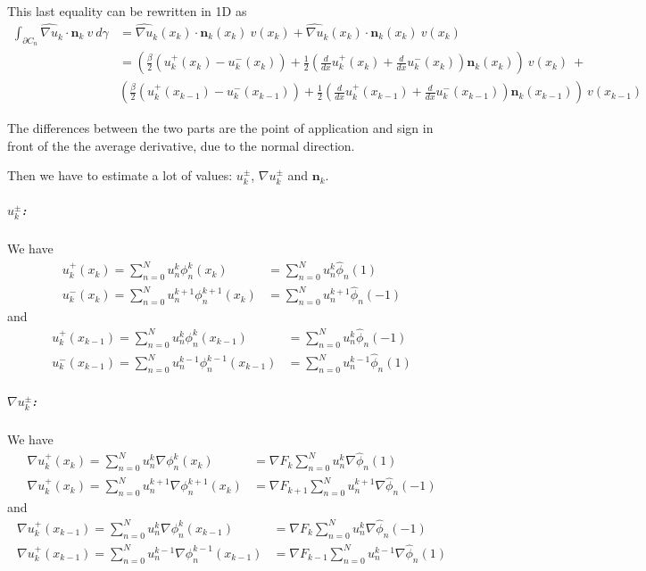 \documentclass[a4paper,10pt,draft]{article}
\begin{document}
This last equality can be rewritten in 1D as
\begin{align*}
 \int_{\partial C_n} \widehat{\nabla u}_k \cdot \mathbf{n}_k\ v\ d\gamma &= \widehat{\nabla 
u}_k(x_k) \cdot \mathbf{n}_k(x_k)\ v(x_k) + \widehat{\nabla u}_k(x_k) \cdot \mathbf{n}_k(x_k)\ 
v(x_k)\\
 &=\left(\frac{\beta}{2} (u^+_k(x_k) - u^-_k(x_k)) + \frac{1}{2} \left(\frac{d}{dx} u^+_k(x_k) + 
\frac{d}{dx} u^-_k(x_k)\right) \mathbf{n}_k(x_k) \right)\ v(x_k) \ + \\
& \left(\frac{\beta}{2} (u^+_k(x_{k-1}) - u^-_k(x_{k-1})) + \frac{1}{2} \left(\frac{d}{dx} 
u^+_k(x_{k-1}) + \frac{d}{dx} u^-_k(x_{k-1})\right)\mathbf{n}_k(x_{k-1}) \right)\ v(x_{k-1})
\end{align*}

The differences between the two parts are the point of application and sign in front of the the 
average derivative, due to the normal direction.

Then we have to estimate a lot of values: $u^\pm_k$, $\nabla u^\pm_k$ and $\mathbf{n}_k$.

\subparagraph{$u^\pm_k$:}
We have
\begin{align*}
 u^+_k(x_k) = \sum_{n=0}^N u_n^k \phi_n^k(x_k) &= \sum_{n=0}^N u_n^k \hat \phi_n(1) \\
 u^-_k(x_k) = \sum_{n=0}^N u_n^{k+1} \phi_n^{k+1}(x_k) &= \sum_{n=0}^N u_n^{k+1} \hat 
\phi_n(-1)
\end{align*}
and
\begin{align*}
 u^+_k(x_{k-1}) = \sum_{n=0}^N u_n^k \phi_n^k(x_{k-1}) &= \sum_{n=0}^N u_n^k \hat \phi_n(-1) 
\\
 u^-_k(x_{k-1}) = \sum_{n=0}^N u_n^{k-1} \phi_n^{k-1}(x_{k-1}) &= \sum_{n=0}^N u_n^{k-1} \hat 
\phi_n(1)
\end{align*}

\subparagraph{$\nabla u^\pm_k$:} We have
\begin{align*}
 \nabla u^+_k(x_k) = \sum_{n=0}^N u_n^k \nabla \phi_n^k(x_k) &= \nabla F_k \sum_{n=0}^N 
u_n^k \nabla \hat \phi_n(1) \\
\nabla u^+_k(x_k) = \sum_{n=0}^N u_n^{k+1} \nabla \phi_n^{k+1}(x_k) &= \nabla F_{k+1} 
\sum_{n=0}^N u_n^{k+1} \nabla \hat \phi_n(-1)
\end{align*}
and
\begin{align*}
 \nabla u^+_k(x_{k-1}) = \sum_{n=0}^N u_n^k \nabla \phi_n^k(x_{k-1}) &= \nabla F_k \sum_{n=0}^N 
u_n^k \nabla \hat \phi_n(-1) \\
\nabla u^+_k(x_{k-1}) = \sum_{n=0}^N u_n^{k-1} \nabla \phi_n^{k-1}(x_{k-1}) &= \nabla F_{k-1} 
\sum_{n=0}^N 
u_n^{k-1} \nabla \hat \phi_n(1)
\end{align*}
\end{document}
